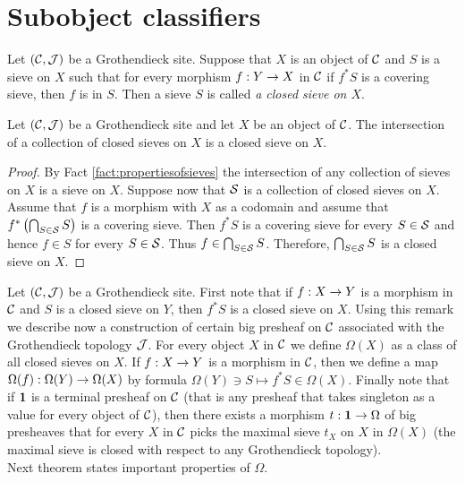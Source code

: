 \section{Subobject classifiers}

\begin{definition}
Let $({\mathcal C},{\mathcal J})$ be a Grothendieck site. Suppose that $X$ is an object of ${\mathcal C}$ and $S$ is a sieve on $X$ such that for every morphism $f:Y\rightarrow X$ in ${\mathcal C}$ if $f^*S$ is a covering sieve, then $f$ is in $S$. Then a sieve $S$ is called \textit{a closed sieve on $X$}.
\end{definition}

\begin{fact}\label{fact:closedsievesarestableunderintersection}
Let $({\mathcal C},{\mathcal J})$ be a Grothendieck site and let $X$ be an object of ${\mathcal C}$. The intersection of a collection of closed sieves on $X$ is a closed sieve on $X$.
\end{fact}
\begin{proof}
By Fact \ref{fact:propertiesofsieves} the intersection of any collection of sieves on $X$ is a sieve on $X$. Suppose now that ${\mathcal S}$ is a collection of closed sieves on $X$. Assume that $f$ is a morphism with $X$ as a codomain and assume that $f^*\left(\bigcap_{S\in {\mathcal S}}S\right)$ is a covering sieve. Then $f^*S$ is a covering sieve for every $S\in {\mathcal S}$ and hence $f\in S$ for every $S\in {\mathcal S}$. Thus $f\in \bigcap_{S\in {\mathcal S}}S$. Therefore, $\bigcap_{S\in {\mathcal S}}S$ is a closed sieve on $X$.
\end{proof}
\noindent
Let $({\mathcal C},{\mathcal J})$ be a Grothendieck site. First note that if $f:X\rightarrow Y$ is a morphism in ${\mathcal C}$ and $S$ is a closed sieve on $Y$, then $f^*S$ is a closed sieve on $X$. Using this remark we describe now a construction of certain big presheaf on ${\mathcal C}$ associated with the Grothendieck topology ${\mathcal J}$. For every object $X$ in ${\mathcal C}$ we define $\Omega(X)$ as a class of all closed sieves on $X$. If $f:X\rightarrow Y$ is a morphism in ${\mathcal C}$, then we define a map $\Omega(f):\Omega(Y)\rightarrow \Omega(X)$ by formula $\Omega(Y)\ni S\mapsto f^*S\in \Omega(X)$. Finally note that if $\mathbf{1}$ is a terminal presheaf on ${\mathcal C}$ (that is any presheaf that takes singleton as a value for every object of ${\mathcal C}$), then there exists a morphism $t:\mathbf{1}\rightarrow \Omega$ of big presheaves that for every $X$ in ${\mathcal C}$ picks the maximal sieve $t_X$ on $X$ in $\Omega(X)$ (the maximal sieve is closed with respect to any Grothendieck topology).\\
Next theorem states important properties of $\Omega$.

